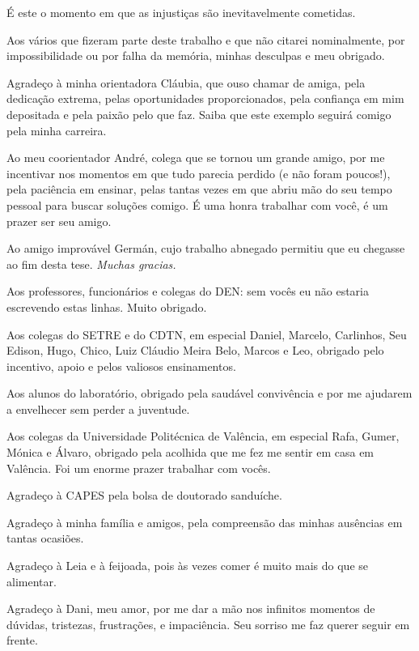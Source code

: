 \documentclass[12pt,openright,twoside,a4paper,english,french,spanish,brazil]{abntex2}
\begin{document}
\begin{agradecimentos}

  É este o momento em que as injustiças são inevitavelmente cometidas.

  Aos vários que fizeram parte deste trabalho e que não citarei nominalmente,
  por impossibilidade ou por falha da memória, minhas desculpas e meu obrigado.

  Agradeço à minha orientadora Cláubia, que ouso chamar de amiga, pela dedicação extrema,
  pelas oportunidades proporcionados, pela confiança em mim depositada e pela paixão pelo que faz.
  Saiba que este exemplo seguirá comigo pela minha carreira.

  Ao meu coorientador André, colega que se tornou um grande amigo, por me incentivar
  nos momentos em que tudo parecia perdido (e não foram poucos!), pela paciência em ensinar, pelas
  tantas vezes em que abriu mão do seu tempo pessoal para buscar soluções comigo. É uma honra
  trabalhar com você, é um prazer ser seu amigo.

  Ao amigo improvável Germán, cujo trabalho abnegado permitiu que eu chegasse ao fim desta tese.
  \textit{Muchas gracias.}
  
  Aos professores, funcionários e colegas do DEN: sem vocês eu não estaria escrevendo estas linhas.
  Muito obrigado.

  Aos colegas do SETRE e do CDTN, em especial Daniel, Marcelo, Carlinhos, Seu Edison, Hugo, Chico, Luiz Cláudio
  Meira Belo, Marcos e Leo, obrigado pelo incentivo, apoio e pelos valiosos ensinamentos.

  Aos alunos do laboratório, obrigado pela saudável convivência e por me ajudarem a envelhecer sem
  perder a juventude.

  Aos colegas da Universidade Politécnica de Valência, em especial Rafa, Gumer, Mónica e Álvaro,
  obrigado pela acolhida que me fez me sentir em casa em Valência. Foi um enorme prazer trabalhar com
  vocês.

  Agradeço à CAPES pela bolsa de doutorado sanduíche.

  Agradeço à minha família e amigos, pela compreensão das minhas ausências em tantas ocasiões.

  Agradeço à Leia e à feijoada, pois às vezes comer é muito mais do que se alimentar.

  Agradeço à Dani, meu amor, por me dar a mão nos infinitos momentos de dúvidas, tristezas, frustrações,
  e impaciência. Seu sorriso me faz querer seguir em frente. 

  
\end{agradecimentos}
\end{document}
